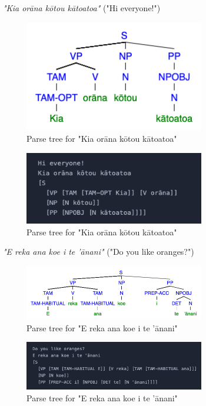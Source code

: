 \begin{enumarabic}
  \newpage
  \item \emph{"Kia orāna kōtou kātoatoa"} ("Hi everyone!")
        
    \begin{figure}[H]
      \centering
      \includegraphics[width=0.7\textwidth]{figures/1.3.png}
      \caption{Parse tree for "Kia orāna kōtou kātoatoa"}
    \end{figure}

    \begin{figure}[H]
      \centering
      \includegraphics[width=0.7\textwidth]{figures/1.3b.png}
      \caption{Parse tree for "Kia orāna kōtou kātoatoa"}
    \end{figure}

  \newpage
  \item \emph{"E reka ana koe i te 'ānani"} ("Do you like oranges?")
            
    \begin{figure}[H]
      \centering
      \includegraphics[width=0.7\textwidth]{figures/1.4.png}
      \caption{Parse tree for "E reka ana koe i te 'ānani"}
    \end{figure}

    \begin{figure}[H]
      \centering
      \includegraphics[width=0.7\textwidth]{figures/1.4b.png}
      \caption{Parse tree for "E reka ana koe i te 'ānani"}
    \end{figure}


\end{enumarabic}
